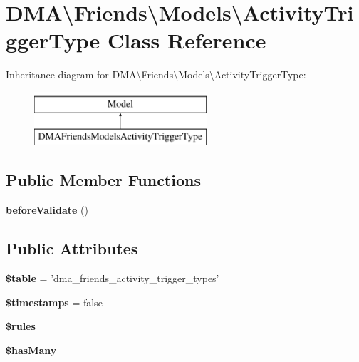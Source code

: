\hypertarget{classDMA_1_1Friends_1_1Models_1_1ActivityTriggerType}{\section{D\-M\-A\textbackslash{}Friends\textbackslash{}Models\textbackslash{}Activity\-Trigger\-Type Class Reference}
\label{classDMA_1_1Friends_1_1Models_1_1ActivityTriggerType}
}
Inheritance diagram for D\-M\-A\textbackslash{}Friends\textbackslash{}Models\textbackslash{}Activity\-Trigger\-Type\-:\begin{figure}[H]
\begin{center}
\leavevmode
\includegraphics[height=2.000000cm]{d4/dc1/classDMA_1_1Friends_1_1Models_1_1ActivityTriggerType}
\end{center}
\end{figure}
\subsection*{Public Member Functions}
\begin{DoxyCompactItemize}
\item 
\hypertarget{classDMA_1_1Friends_1_1Models_1_1ActivityTriggerType_ad7d61fb031c7d4d9cf6a5b55bf555bec}{{\bfseries before\-Validate} ()}\label{classDMA_1_1Friends_1_1Models_1_1ActivityTriggerType_ad7d61fb031c7d4d9cf6a5b55bf555bec}

\end{DoxyCompactItemize}
\subsection*{Public Attributes}
\begin{DoxyCompactItemize}
\item 
\hypertarget{classDMA_1_1Friends_1_1Models_1_1ActivityTriggerType_a1dfd767d241b180576255684b4a09b32}{{\bfseries \$table} = 'dma\-\_\-friends\-\_\-activity\-\_\-trigger\-\_\-types'}\label{classDMA_1_1Friends_1_1Models_1_1ActivityTriggerType_a1dfd767d241b180576255684b4a09b32}

\item 
\hypertarget{classDMA_1_1Friends_1_1Models_1_1ActivityTriggerType_a6d228ad02fb8e2a94319a6b45e36f7fd}{{\bfseries \$timestamps} = false}\label{classDMA_1_1Friends_1_1Models_1_1ActivityTriggerType_a6d228ad02fb8e2a94319a6b45e36f7fd}

\item 
{\bfseries \$rules}
\item 
{\bfseries \$has\-Many}
\end{DoxyCompactItemize}
